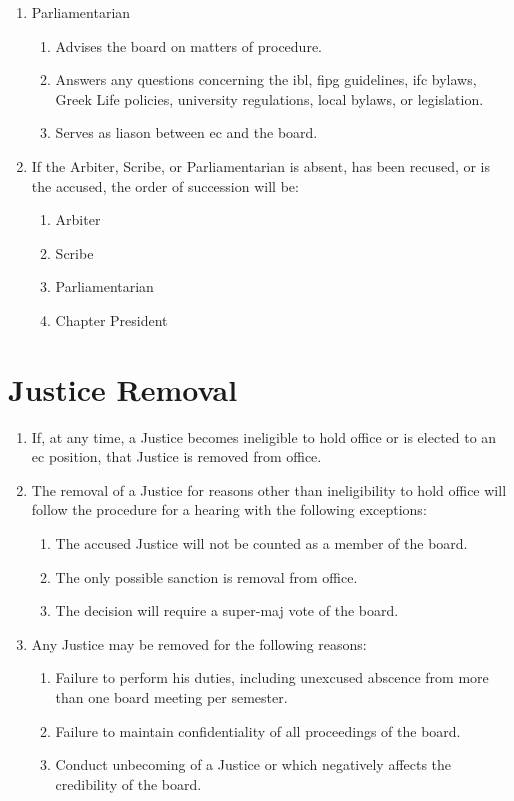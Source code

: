 \begin{enumerate}
		\item Parliamentarian
			\begin{enumerate}
				\item Advises the board on matters of procedure.
				\item Answers any questions concerning the \gls{ibl}, \gls{fipg} guidelines, \gls{ifc} bylaws, Greek Life policies, university regulations, local bylaws, or legislation.
				\item Serves as liason between \gls{ec} and the board.
			\end{enumerate}	

		\item If the Arbiter, Scribe, or Parliamentarian is absent, has been recused, or is the accused, the order of succession will be:
			\begin{enumerate}
				\item Arbiter
				\item Scribe
				\item Parliamentarian
				\item Chapter President
			\end{enumerate}

	\end{enumerate}

\section{Justice Removal}
	\begin{enumerate}
		\item If, at any time, a Justice becomes ineligible to hold office or is elected to an \gls{ec} position, that Justice is removed from office.
		\item The removal of a Justice for reasons other than ineligibility to hold office will follow the procedure for a hearing with the following exceptions:
			\begin{enumerate}
				\item The accused Justice will not be counted as a member of the board.
				\item The only possible sanction is removal from office.
				\item The decision will require a \gls{super-maj} vote of the board.
			\end{enumerate}

		\item Any Justice may be removed for the following reasons:
			\begin{enumerate}
				\item Failure to perform his duties, including unexcused abscence from more than one board meeting per semester.
				\item Failure to maintain confidentiality of all proceedings of the board.
				\item Conduct unbecoming of a Justice or which negatively affects the credibility of the board.
			\end{enumerate}
	\end{enumerate}

